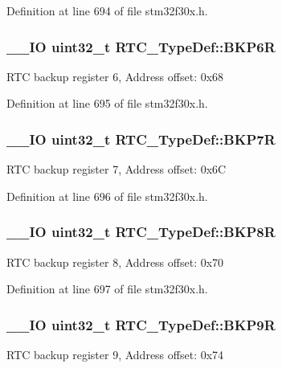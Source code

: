 Definition at line 694 of file stm32f30x.\-h.

\hypertarget{struct_r_t_c___type_def_a766e2071c5826e3a299ae1cd5bbf06f7}{
\subsubsection[{B\-K\-P6\-R}]{\setlength{\rightskip}{0pt plus 5cm}\-\_\-\-\_\-\-I\-O {\bf uint32\-\_\-t} R\-T\-C\-\_\-\-Type\-Def\-::\-B\-K\-P6\-R}}\label{struct_r_t_c___type_def_a766e2071c5826e3a299ae1cd5bbf06f7}
R\-T\-C backup register 6, Address offset\-: 0x68 

Definition at line 695 of file stm32f30x.\-h.

\hypertarget{struct_r_t_c___type_def_a9934af6ae6b3f5660204d48ceb2f3192}{
\subsubsection[{B\-K\-P7\-R}]{\setlength{\rightskip}{0pt plus 5cm}\-\_\-\-\_\-\-I\-O {\bf uint32\-\_\-t} R\-T\-C\-\_\-\-Type\-Def\-::\-B\-K\-P7\-R}}\label{struct_r_t_c___type_def_a9934af6ae6b3f5660204d48ceb2f3192}
R\-T\-C backup register 7, Address offset\-: 0x6\-C 

Definition at line 696 of file stm32f30x.\-h.

\hypertarget{struct_r_t_c___type_def_a0e7fca11f1c953270ee0ee6028860add}{
\subsubsection[{B\-K\-P8\-R}]{\setlength{\rightskip}{0pt plus 5cm}\-\_\-\-\_\-\-I\-O {\bf uint32\-\_\-t} R\-T\-C\-\_\-\-Type\-Def\-::\-B\-K\-P8\-R}}\label{struct_r_t_c___type_def_a0e7fca11f1c953270ee0ee6028860add}
R\-T\-C backup register 8, Address offset\-: 0x70 

Definition at line 697 of file stm32f30x.\-h.

\hypertarget{struct_r_t_c___type_def_abadf1ac26350bf00575428be6a05708b}{
\subsubsection[{B\-K\-P9\-R}]{\setlength{\rightskip}{0pt plus 5cm}\-\_\-\-\_\-\-I\-O {\bf uint32\-\_\-t} R\-T\-C\-\_\-\-Type\-Def\-::\-B\-K\-P9\-R}}\label{struct_r_t_c___type_def_abadf1ac26350bf00575428be6a05708b}
R\-T\-C backup register 9, Address offset\-: 0x74 

